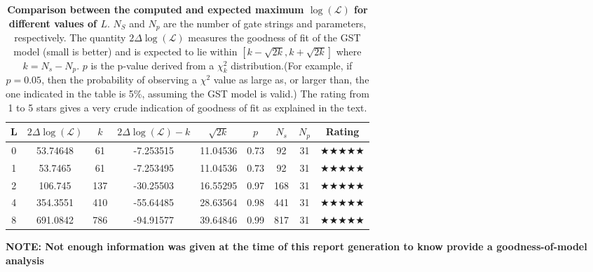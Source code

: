 \documentclass{article}[11pt]
\begin{document}
{\begin{table}[h]
\begin{center}
\begin{tabular}[l]{|c|c|c|c|c|c|c|c|c|}
\hline
L & $2\Delta\log(\mathcal{L})$ & $k$ & $2\Delta\log(\mathcal{L})-k$ & $\sqrt{2k}$ & $p$ & $N_s$ & $N_p$ & Rating \\ \hline
0 & 53.74648 & 61 & -7.253515 & 11.04536 & 0.73 & 92 & 31 & $\bigstar\bigstar\bigstar\bigstar\bigstar$ \\ \hline
1 & 53.7465 & 61 & -7.253495 & 11.04536 & 0.73 & 92 & 31 & $\bigstar\bigstar\bigstar\bigstar\bigstar$ \\ \hline
2 & 106.745 & 137 & -30.25503 & 16.55295 & 0.97 & 168 & 31 & $\bigstar\bigstar\bigstar\bigstar\bigstar$ \\ \hline
4 & 354.3551 & 410 & -55.64485 & 28.63564 & 0.98 & 441 & 31 & $\bigstar\bigstar\bigstar\bigstar\bigstar$ \\ \hline
8 & 691.0842 & 786 & -94.91577 & 39.64846 & 0.99 & 817 & 31 & $\bigstar\bigstar\bigstar\bigstar\bigstar$ \\ \hline
\end{tabular}

\caption{\textbf{Comparison between the computed and expected maximum $\log(\mathcal{L})$ for different values of $L$}.  $N_S$ and $N_p$ are the number of gate strings and parameters, respectively.  The quantity $2\Delta\log(\mathcal{L})$ measures the goodness of fit of the GST model (small is better) and is expected to lie within $[k-\sqrt{2k},k+\sqrt{2k}]$ where $k = N_s-N_p$. $p$ is the p-value derived from a $\chi^2_k$ distribution.(For example, if $p=0.05$, then the probability of observing a $\chi^{2}$ value as large as, or larger than, the one indicated in the table is 5\%, assuming the GST model is valid.) The rating from 1 to 5 stars gives a very crude indication of goodness of fit as explained in the text.\label{progressTable}}
\end{center}
\end{table}

}{
\textbf{NOTE: Not enough information was given at the time of this report generation to know provide a goodness-of-model analysis}
}

\FloatBarrier
\end{document}
